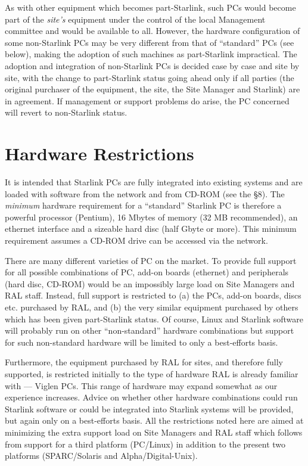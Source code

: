 \documentclass[twoside,11pt]{article}
\begin{document}
As with other equipment which becomes part-Starlink, such PCs would
become part of the {\em site's} equipment under the control of the
local Management committee and would be available to
all.  However, the hardware configuration of some non-Starlink PCs may
be very different from that of ``standard'' PCs (see below), making the
adoption of such machines as part-Starlink impractical.  The
adoption and integration of non-Starlink PCs is decided case by case
and site by site, with the change to part-Starlink status going ahead
only if all parties (the original purchaser of the equipment, the site,
the Site Manager and Starlink) are in agreement.  If management or
support problems do arise, the PC concerned will revert to
non-Starlink status.

\section{Hardware Restrictions}

It is intended that Starlink PCs are fully integrated into existing
systems and are loaded with software from the network and from CD-ROM
(see the \S 8).  The {\em minimum} hardware requirement for a
``standard'' Starlink PC is therefore a powerful processor (Pentium),
16 Mbytes of memory (32 MB recommended), an ethernet interface and a sizeable hard disc
(half Gbyte or more).  This minimum requirement assumes a CD-ROM drive
can be accessed via the network.

There are many different varieties of PC on the market.  To provide
full support for all possible combinations of PC, add-on boards
(ethernet) and peripherals (hard disc, CD-ROM) would be an impossibly
large load on Site Managers and RAL staff.  Instead, 
full support is restricted to  (a) the PCs, add-on boards, discs etc.
purchased by RAL, and (b) the very similar equipment purchased by
others which has been given part-Starlink status.  Of course, Linux and
Starlink software will probably run on other ``non-standard'' hardware
combinations but support for such non-standard hardware will be limited
to only a best-efforts basis.

Furthermore, the equipment purchased by RAL for sites, and
therefore fully supported, is restricted initially to the type of
hardware RAL is already familiar with --- Viglen PCs. 
This range of hardware may expand somewhat as our experience
increases.  Advice on whether other hardware combinations could run
Starlink software or could be integrated into Starlink systems will be
provided, but again only on a best-efforts basis.  All the
restrictions noted here are aimed at minimizing the extra support load on
Site Managers and RAL staff which follows from support for a third
platform (PC/Linux) in addition to the present two platforms
(SPARC/Solaris and Alpha/Digital-Unix).
\end{document}

